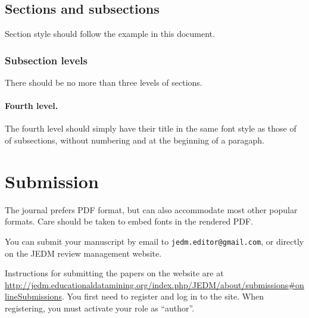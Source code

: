 \documentclass[notitlepage,12pt]{jedm}
\begin{document}
\subsection{Sections and subsections}

Section style should follow the example in this document.

\subsubsection{Subsection levels}

There should be no more than three levels of sections.

\paragraph{Fourth level.}

The fourth level should simply have their title in the same font style as those of of subsections, without numbering and at the beginning of a paragaph.

\section{Submission}

The journal prefers PDF format, but can also accommodate most other popular formats.  Care should be taken to embed fonts in the rendered PDF.

You can submit your manuscript by email to \texttt{jedm.editor@gmail.com}, or directly on the JEDM review management website.

Instructions for submitting the papers on the website are at \url{http://jedm.educationaldatamining.org/index.php/JEDM/about/submissions#onlineSubmissions}.  You first need to register and log in to the site.  When registering, you must activate your role as ``author''.

\nocite{*}



\end{document}
